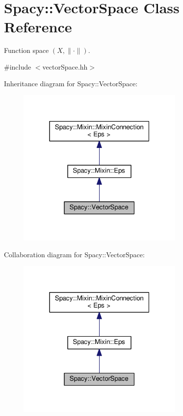 \hypertarget{classSpacy_1_1VectorSpace}{}\section{Spacy\+:\+:Vector\+Space Class Reference}
\label{classSpacy_1_1VectorSpace}


Function space $(X,\|\cdot\|)$.  




{\ttfamily \#include $<$vector\+Space.\+hh$>$}



Inheritance diagram for Spacy\+:\+:Vector\+Space\+:
\nopagebreak
\begin{figure}[H]
\begin{center}
\leavevmode
\includegraphics[width=232pt]{classSpacy_1_1VectorSpace__inherit__graph}
\end{center}
\end{figure}


Collaboration diagram for Spacy\+:\+:Vector\+Space\+:
\nopagebreak
\begin{figure}[H]
\begin{center}
\leavevmode
\includegraphics[width=232pt]{classSpacy_1_1VectorSpace__coll__graph}
\end{center}
\end{figure}
